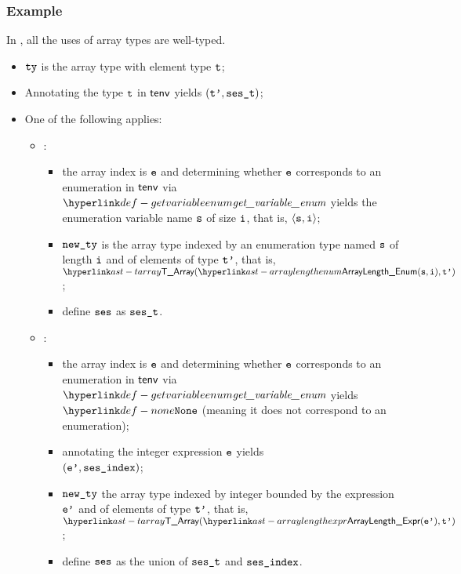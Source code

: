 \subsubsection{Example}
In , all the uses of array types are well-typed.

\ProseParagraph
\AllApply
\begin{itemize}
  \item $\texttt{ty}$ is the array type with element type $\texttt{t}$;
  \item Annotating the type $\texttt{t}$ in $\textsf{tenv}$ yields $(\texttt{t'}, \texttt{ses\_t})$\ProseOrTypeError;
  \item One of the following applies:
  \begin{itemize}
    \item {}:
    \begin{itemize}
      \item the array index is $\texttt{e}$ and determining whether $\texttt{e}$ corresponds to an enumeration in $\textsf{tenv}$
      via $\getvariableenum$ yields the enumeration variable
      name $\texttt{s}$ of size $\texttt{i}$, that is, $\langle \texttt{s}, \texttt{i} \rangle$\ProseOrTypeError;
      \item $\texttt{new\_ty}$ is the array type indexed by an enumeration type
      named $\texttt{s}$ of length $\texttt{i}$ and of elements of type $\texttt{t'}$, that is, $\TArray(\ArrayLengthEnum(\vs, \vi), \vtp)$;
      \item define $\texttt{ses}$ as $\texttt{ses\_t}$.
    \end{itemize}

    \item {}:
    \begin{itemize}
      \item the array index is $\texttt{e}$ and determining whether $\texttt{e}$ corresponds to an enumeration in $\textsf{tenv}$
      via $\getvariableenum$ yields $\None$ (meaning it does not
      correspond to an enumeration)\ProseOrTypeError;
      \item annotating the \symbolicallyevaluable{} integer expression $\texttt{e}$ yields\\
      $(\texttt{e'}, \texttt{ses\_index})$\ProseOrTypeError;
      \item $\texttt{new\_ty}$ the array type indexed by integer bounded by
      the expression $\texttt{e'}$ and of elements of type $\texttt{t'}$, that is,
      $\TArray(\ArrayLengthExpr(\vep), \vtp)$;
      \item define $\texttt{ses}$ as the union of $\texttt{ses\_t}$ and $\texttt{ses\_index}$.
    \end{itemize}
  \end{itemize}
\end{itemize}
